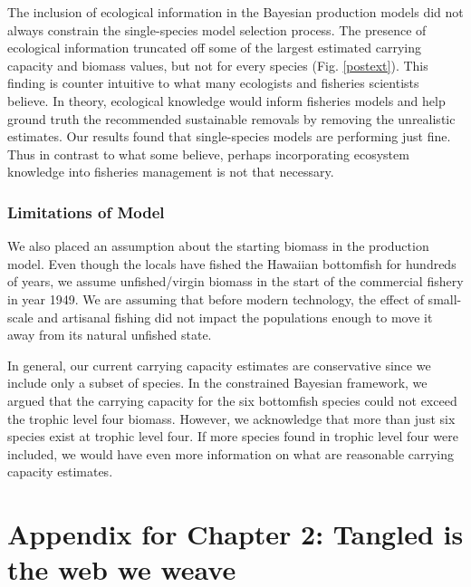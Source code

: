 \documentclass[oneside,12pt,final]{sty/ucthesis-CA2012}
\begin{document}
\begin{mainmatter}
\vspace{5mm}
 
The inclusion of ecological information in the Bayesian production models did not always constrain the single-species model selection process. The presence of ecological information truncated off some of the largest estimated carrying capacity and biomass values, but not for every species (Fig. \ref{postext}). This finding is counter intuitive to what many ecologists and fisheries scientists believe. In theory, ecological knowledge would inform fisheries models and help ground truth the recommended sustainable removals by removing the unrealistic estimates. Our results found that single-species models are performing just fine. Thus in contrast to what some believe, perhaps incorporating ecosystem knowledge into fisheries management is not that necessary.
 
\subsection*{Limitations of Model}
We also placed an assumption about the starting biomass in the production model. Even though the locals have fished the Hawaiian bottomfish for hundreds of years, we assume unfished/virgin biomass in the start of the commercial fishery in year 1949. We are assuming that before modern technology, the effect of small-scale and artisanal fishing did not impact the populations enough to move it away from its natural unfished state. 

\vspace{5mm}

In general, our current carrying capacity estimates are conservative since we include only a subset of species. In the constrained Bayesian framework, we argued that the carrying capacity for the six bottomfish species could not exceed the trophic level four biomass. However, we acknowledge that more than just six species exist at trophic level four. If more species found in trophic level four were included, we would have even more information on what are reasonable carrying capacity estimates. 





\appendix

\dsp

\chapter{Appendix for Chapter 2: Tangled is the web we weave}{\label{appendix:a}}


\end{mainmatter}
\end{document}
